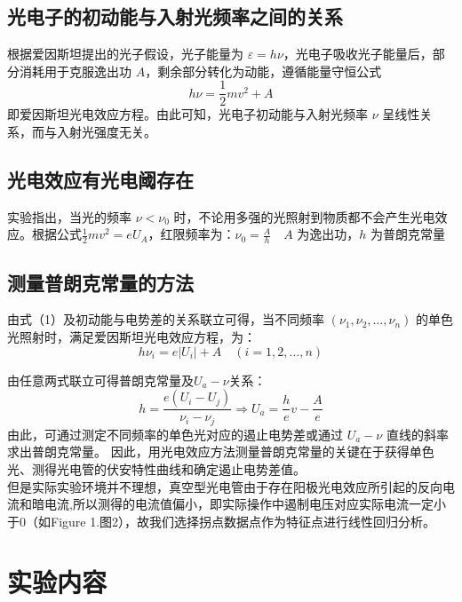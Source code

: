 \documentclass[12pt,a4paper]{article}
\begin{document}
	\subsection{光电子的初动能与入射光频率之间的关系}

	根据爱因斯坦提出的光子假设，光子能量为 $\varepsilon = h\nu$，光电子吸收光子能量后，部分消耗用于克服逸出功 $A$，剩余部分转化为动能，遵循能量守恒公式
	\begin{equation}
	h\nu = \frac{1}{2}mv^2 + A
	\end{equation}
	即爱因斯坦光电效应方程。由此可知，光电子初动能与入射光频率 $\nu$ 呈线性关系，而与入射光强度无关。
	
	\subsection{光电效应有光电阈存在}

	实验指出，当光的频率 $\nu < \nu_0$ 时，不论用多强的光照射到物质都不会产生光电效应。根据公式$\frac{1}{2}mv^2 = eU_A$，红限频率为：\quad $\nu_0 = \frac{A}{h} \quad \text{$A$ 为逸出功，$h$ 为普朗克常量}$

		

	\subsection{测量普朗克常量的方法}

	由式（1）及初动能与电势差的关系联立可得，当不同频率 $(\nu_1, \nu_2, \dots, \nu_n)$ 的单色光照射时，满足爱因斯坦光电效应方程，为：  
	\begin{equation}
	h\nu_i = e|U_i| + A \quad (i = 1,2,\dots,n)
	\end{equation}   

	由任意两式联立可得普朗克常量及$U_{a}-\nu$关系：
	\begin{equation}
	h = \frac{e(U_i - U_j)}{\nu_i - \nu_j}\Rightarrow U_{a}=\frac{h}{e}v-\frac{A}{e}
	\end{equation}
	由此，可通过测定不同频率的单色光对应的遏止电势差或通过 $U_{a}-\nu$ 直线的斜率求出普朗克常量。
	因此，用光电效应方法测量普朗克常量的关键在于获得单色光、测得光电管的伏安特性曲线和确定遏止电势差值。\\
	但是实际实验环境并不理想，真空型光电管由于存在阳极光电效应所引起的反向电流和暗电流,所以测得的电流值偏小，即实际操作中遏制电压对应实际电流一定小于0（如Figure 1.图2），故我们选择拐点数据点作为特征点进行线性回归分析。

	\section{实验内容}
\end{document}
